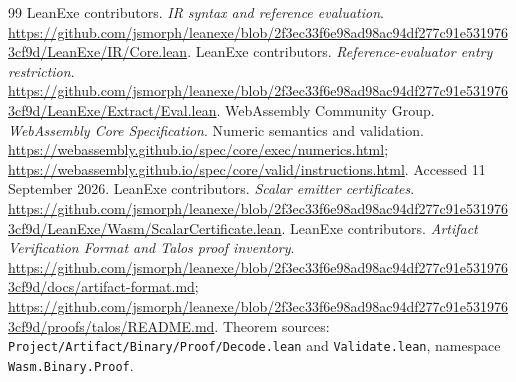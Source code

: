 \documentclass[11pt]{article}
\newcommand{\code}[1]{\texttt{#1}}
\begin{document}
\begin{thebibliography}{99}
 LeanExe contributors. \emph{IR syntax and reference evaluation}. \url{https://github.com/jsmorph/leanexe/blob/2f3ec33f6e98ad98ac94df277c91e5319763cf9d/LeanExe/IR/Core.lean}.
 LeanExe contributors. \emph{Reference-evaluator entry restriction}. \url{https://github.com/jsmorph/leanexe/blob/2f3ec33f6e98ad98ac94df277c91e5319763cf9d/LeanExe/Extract/Eval.lean}.
 WebAssembly Community Group. \emph{WebAssembly Core Specification}. Numeric semantics and validation. \url{https://webassembly.github.io/spec/core/exec/numerics.html}; \url{https://webassembly.github.io/spec/core/valid/instructions.html}. Accessed 11 September 2026.
 LeanExe contributors. \emph{Scalar emitter certificates}. \url{https://github.com/jsmorph/leanexe/blob/2f3ec33f6e98ad98ac94df277c91e5319763cf9d/LeanExe/Wasm/ScalarCertificate.lean}.
 LeanExe contributors. \emph{Artifact Verification Format and Talos proof inventory}. \url{https://github.com/jsmorph/leanexe/blob/2f3ec33f6e98ad98ac94df277c91e5319763cf9d/docs/artifact-format.md}; \url{https://github.com/jsmorph/leanexe/blob/2f3ec33f6e98ad98ac94df277c91e5319763cf9d/proofs/talos/README.md}. Theorem sources: \code{Project/Artifact/Binary/Proof/Decode.lean} and \code{Validate.lean}, namespace \code{Wasm.Binary.Proof}.
\end{thebibliography}
\end{document}
